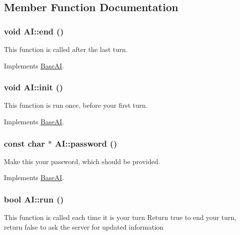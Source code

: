 \subsection{Member Function Documentation}
\hypertarget{classAI_a67b00a8dd5c6d73db2e4e2332826462e}{
\subsubsection[{end}]{\setlength{\rightskip}{0pt plus 5cm}void AI::end ()}}
\label{classAI_a67b00a8dd5c6d73db2e4e2332826462e}
This function is called after the last turn. 

Implements \hyperlink{classBaseAI_a60c8246a859ba2dba84b70239bc129bc}{BaseAI}.

\hypertarget{classAI_a8c8e3a635791abaa61585357e6a25f63}{
\subsubsection[{init}]{\setlength{\rightskip}{0pt plus 5cm}void AI::init ()}}
\label{classAI_a8c8e3a635791abaa61585357e6a25f63}
This function is run once, before your first turn. 

Implements \hyperlink{classBaseAI_a90ce8becd6f2e32c2cc32d41145e88df}{BaseAI}.

\hypertarget{classAI_aa4e58e11bbbdb040e6b12f8706763a00}{
\subsubsection[{password}]{\setlength{\rightskip}{0pt plus 5cm}const char $\ast$ AI::password ()}}
\label{classAI_aa4e58e11bbbdb040e6b12f8706763a00}
Make this your password, which should be provided. 

Implements \hyperlink{classBaseAI_a9251e20447917cda64ad1487b903456f}{BaseAI}.

\hypertarget{classAI_a3c4746756b699cee5225597506521a39}{
\subsubsection[{run}]{\setlength{\rightskip}{0pt plus 5cm}bool AI::run ()}}
\label{classAI_a3c4746756b699cee5225597506521a39}
This function is called each time it is your turn Return true to end your turn, return false to ask the server for updated information 

